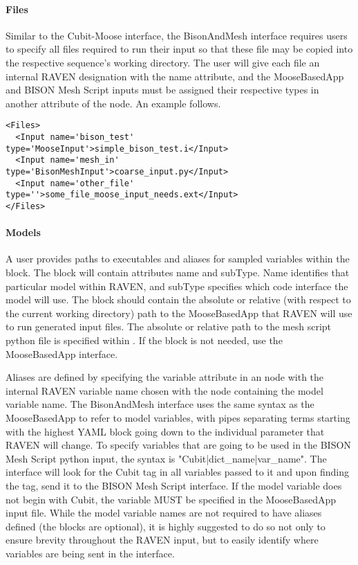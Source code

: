 \paragraph{Files}
Similar to the Cubit-Moose interface, the BisonAndMesh interface
requires users to specify all files required to run their input
so that these file may be copied into the respective sequence's 
working directory.  The user will give each file an internal
RAVEN designation with the name attribute, and the MooseBasedApp
and BISON Mesh Script inputs must be assigned their respective types
in another attribute of the  node.  An example follows.

\begin{lstlisting}[style=XML]
<Files>
  <Input name='bison_test' type='MooseInput'>simple_bison_test.i</Input>
  <Input name='mesh_in'    type='BisonMeshInput'>coarse_input.py</Input>
  <Input name='other_file' type=''>some_file_moose_input_needs.ext</Input>
</Files>
\end{lstlisting}

\paragraph{Models}
A user provides paths to executables and aliases for sampled variables within the
 block.  The  block will contain attributes name and
subType.  Name identifies that particular  model within RAVEN, and
subType specifies which code interface the model will use. The 
block should contain the absolute or relative (with respect to the current working
directory) path to the MooseBasedApp that RAVEN will use to run generated input
files.  The absolute or relative path to the mesh script python file is specified within
.  If the  block is not needed, use the
MooseBasedApp interface.

Aliases are defined by specifying the variable attribute in an  node with
the internal RAVEN variable name chosen with the node containing the model
variable name.  The BisonAndMesh interface uses the same syntax as the
MooseBasedApp to refer to model variables, with pipes separating terms starting
with the highest YAML block going down to the individual parameter that RAVEN
will change.  To specify variables that are going to be used in the BISON Mesh Script
python input, the syntax is "Cubit|dict\_name|var\_name".  The interface
will look for the Cubit tag in all variables passed to it and upon finding the tag,
send it to the BISON Mesh Script interface.  If the model variable does not begin with Cubit,
the variable MUST be specified in the MooseBasedApp input file.  While the model
variable names are not required to have aliases defined (the 
blocks are optional), it is highly suggested to do so not only to ensure brevity
throughout the RAVEN input, but to easily identify where variables are being sent
in the interface.

